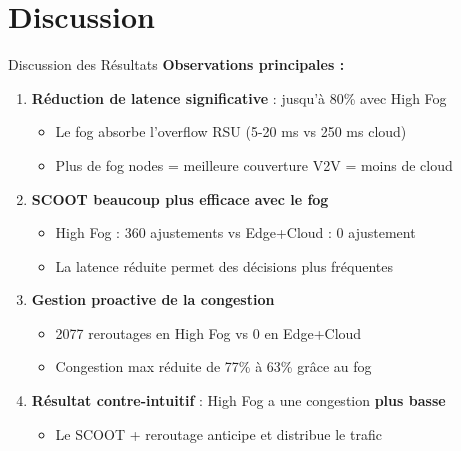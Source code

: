 \documentclass[10pt,aspectratio=169]{beamer}
\begin{document}
\section{Discussion}

\begin{frame}{Discussion des R\'esultats}
\textbf{Observations principales :}

\begin{enumerate}
    \item \textbf{R\'eduction de latence significative} : jusqu'\`a 80\% avec High Fog
    \begin{itemize}
        \item Le fog absorbe l'overflow RSU (5-20 ms vs 250 ms cloud)
        \item Plus de fog nodes = meilleure couverture V2V = moins de cloud
    \end{itemize}
    
    \item \textbf{SCOOT beaucoup plus efficace avec le fog}
    \begin{itemize}
        \item High Fog : 360 ajustements vs Edge+Cloud : 0 ajustement
        \item La latence r\'eduite permet des d\'ecisions plus fr\'equentes
    \end{itemize}
    
    \item \textbf{Gestion proactive de la congestion}
    \begin{itemize}
        \item 2077 reroutages en High Fog vs 0 en Edge+Cloud
        \item Congestion max r\'eduite de 77\% \`a 63\% gr\^ace au fog
    \end{itemize}
    
    \item \textbf{R\'esultat contre-intuitif} : High Fog a une congestion \textbf{plus basse}
    \begin{itemize}
        \item Le SCOOT + reroutage anticipe et distribue le trafic
    \end{itemize}
\end{enumerate}
\end{frame}
\end{document}
